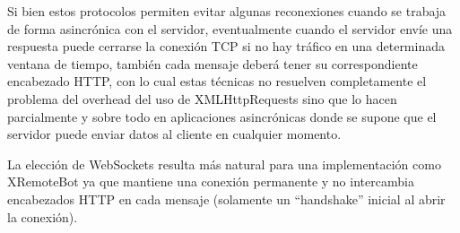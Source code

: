 Si bien estos protocolos permiten evitar algunas reconexiones cuando
se trabaja de forma asincrónica con el servidor, eventualmente cuando el
servidor envíe una respuesta puede cerrarse la conexión TCP
si no hay tráfico en una determinada ventana de tiempo,
también cada mensaje
deberá tener su correspondiente encabezado HTTP, con lo cual
estas técnicas no resuelven completamente el problema del overhead del
uso de XMLHttpRequests sino que lo hacen parcialmente y sobre todo
en aplicaciones asincrónicas donde se supone que el servidor puede enviar
datos al cliente en cualquier momento.

La elección de WebSockets resulta más natural para una implementación
como XRemoteBot ya que mantiene una conexión permanente y no intercambia
encabezados HTTP en cada mensaje (solamente un ``handshake'' inicial
al abrir la conexión).


